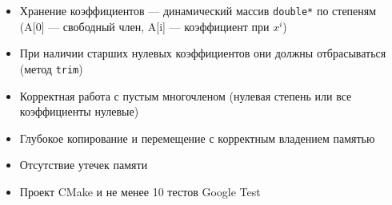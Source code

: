 \begin{itemize}
  \item Хранение коэффициентов — динамический массив \texttt{double*} по степеням (A[0] — свободный член, A[i] — коэффициент при $x^i$)
  \item При наличии старших нулевых коэффициентов они должны отбрасываться (метод \texttt{trim})
  \item Корректная работа с пустым многочленом (нулевая степень или все коэффициенты нулевые)
  \item Глубокое копирование и перемещение с корректным владением памятью
  \item Отсутствие утечек памяти
  \item Проект CMake и не менее 10 тестов Google Test
\end{itemize}

